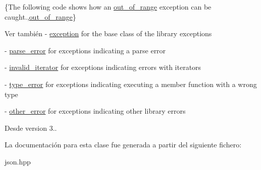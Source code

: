 \{The following code shows how an {\ttfamily \mbox{\hyperlink{classnlohmann_1_1detail_1_1out__of__range}{out\+\_\+of\+\_\+range}}} exception can be caught.,\mbox{\hyperlink{classnlohmann_1_1detail_1_1out__of__range}{out\+\_\+of\+\_\+range}}\}

\begin{DoxySeeAlso}{Ver también}
-\/ \mbox{\hyperlink{classnlohmann_1_1detail_1_1exception}{exception}} for the base class of the library exceptions 

-\/ \mbox{\hyperlink{classnlohmann_1_1detail_1_1parse__error}{parse\+\_\+error}} for exceptions indicating a parse error 

-\/ \mbox{\hyperlink{classnlohmann_1_1detail_1_1invalid__iterator}{invalid\+\_\+iterator}} for exceptions indicating errors with iterators 

-\/ \mbox{\hyperlink{classnlohmann_1_1detail_1_1type__error}{type\+\_\+error}} for exceptions indicating executing a member function with a wrong type 

-\/ \mbox{\hyperlink{classnlohmann_1_1detail_1_1other__error}{other\+\_\+error}} for exceptions indicating other library errors
\end{DoxySeeAlso}
\begin{DoxySince}{Desde}
version 3.. 
\end{DoxySince}


La documentación para esta clase fue generada a partir del siguiente fichero\+:\begin{DoxyCompactItemize}
\item 
json.\+hpp\end{DoxyCompactItemize}
